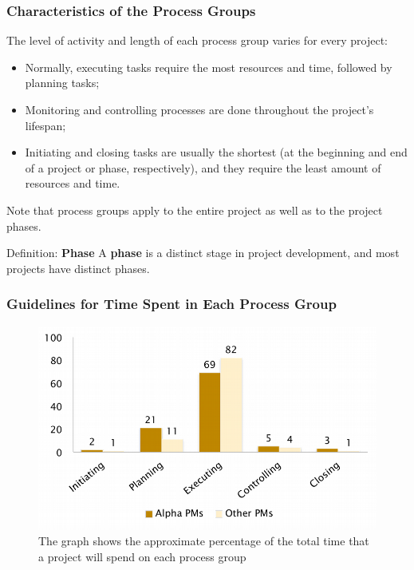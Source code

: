 \documentclass{beamer}
\begin{document}
\begin{frame}
\frametitle{Characteristics of the Process Groups}
The level of activity and length of each process group varies for every project:
\begin{itemize}
\item Normally, executing tasks require the most resources and time, followed by planning tasks;
\item Monitoring and controlling processes are done throughout the project's lifespan;
\item Initiating and closing tasks are usually the shortest (at the beginning and end of a project or phase, respectively), and they require the least amount of resources and time.
\end{itemize}
Note that process groups apply to the entire project as well as to the project phases.
\begin{block}{Definition: \textbf{Phase}}
A \textbf{phase} is a distinct stage in project development, and most projects have distinct phases.
\end{block}
\end{frame}

\begin{frame}
\frametitle{Guidelines for Time Spent in Each Process Group}
\begin{figure}
\includegraphics[scale=0.45]{time_spent_proc}
\caption{The graph shows the approximate percentage of the total time that a project will spend on each process group}
\end{figure}
\end{frame}
\end{document}
